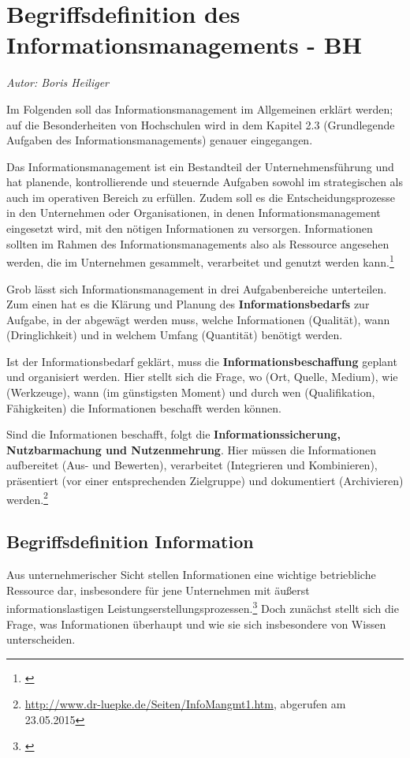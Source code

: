 \section{Begriffsdefinition des Informationsmanagements - BH}
\label{begriffsdefintion_inm}
\textit{Autor: Boris Heiliger}

Im Folgenden soll das Informationsmanagement im Allgemeinen erklärt werden; auf die Besonderheiten von Hochschulen wird in dem Kapitel 2.3 (Grundlegende Aufgaben des Informationsmanagements) genauer eingegangen.

Das Informationsmanagement ist ein Bestandteil der Unternehmensführung und hat planende, kontrollierende und steuernde Aufgaben sowohl im strategischen als auch im operativen Bereich zu erfüllen. Zudem soll es die Entscheidungsprozesse in den Unternehmen oder Organisationen, in denen Informationsmanagement eingesetzt wird, mit den nötigen Informationen zu versorgen. Informationen sollten im Rahmen des Informationsmanagements also als Ressource angesehen werden, die im Unternehmen gesammelt, verarbeitet und genutzt werden kann.\footnote{\cite[65-68]{voss_informationsmanagement_2001}}

Grob lässt sich Informationsmanagement in drei Aufgabenbereiche unterteilen. Zum einen hat es die Klärung und Planung des \textbf{Informationsbedarfs} zur Aufgabe, in der abgewägt werden muss, welche Informationen (Qualität), wann (Dringlichkeit) und in welchem Umfang (Quantität) benötigt werden.

Ist der Informationsbedarf geklärt, muss die \textbf{Informationsbeschaffung} geplant 
und organisiert werden. Hier stellt sich die Frage, wo (Ort, Quelle, Medium), wie (Werkzeuge), wann (im günstigsten Moment) und durch wen (Qualifikation, Fähigkeiten) die Informationen beschafft werden können.

Sind die Informationen beschafft, folgt die \textbf{Informationssicherung, Nutzbarmachung und Nutzenmehrung}. Hier müssen die Informationen aufbereitet (Aus- und Bewerten), verarbeitet (Integrieren und Kombinieren), präsentiert (vor einer entsprechenden Zielgruppe) und dokumentiert (Archivieren) werden.\footnote{\url{http://www.dr-luepke.de/Seiten/InfoMangmt1.htm}, abgerufen am 23.05.2015}

\subsection{Begriffsdefinition Information}

Aus unternehmerischer Sicht stellen Informationen eine wichtige betriebliche Ressource dar, insbesondere für jene Unternehmen mit äußerst informationslastigen Leistungserstellungsprozessen.\footnote{\cite{BiethanMukschRusch_Informationsmanagement_2004}}
Doch zunächst stellt sich die Frage, was Informationen überhaupt und wie sie sich insbesondere von Wissen unterscheiden.

